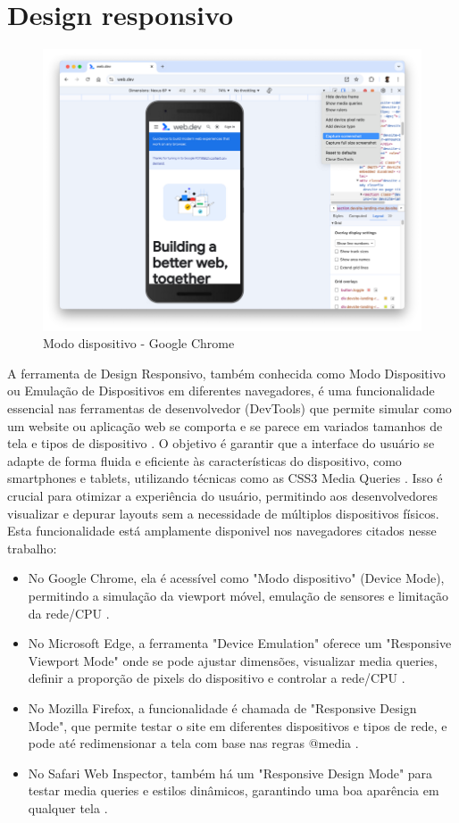 \section{Design responsivo}
\begin{figure}[h!]
    \centering
    \includegraphics[width=0.7\linewidth]{assets/tools/chrome-device.png}
    \caption{Modo dispositivo - Google Chrome }
    \label{fig:enter-label}
\end{figure}
A ferramenta de Design Responsivo, também conhecida como Modo Dispositivo ou Emulação de Dispositivos em diferentes navegadores, é uma funcionalidade essencial nas ferramentas de desenvolvedor (DevTools) que permite simular como um website ou aplicação web se comporta e se parece em variados tamanhos de tela e tipos de dispositivo \cite{edge}. O objetivo é garantir que a interface do usuário se adapte de forma fluida e eficiente às características do dispositivo, como smartphones e tablets, utilizando técnicas como as CSS3 Media Queries \cite{firefox}. Isso é crucial para otimizar a experiência do usuário, permitindo aos desenvolvedores visualizar e depurar layouts sem a necessidade de múltiplos dispositivos físicos. Esta funcionalidade está amplamente disponivel nos navegadores citados nesse trabalho:
\begin{itemize}
    \item No Google Chrome, ela é acessível como "Modo dispositivo" (Device Mode), permitindo a simulação da viewport móvel, emulação de sensores e limitação da rede/CPU \cite{chrome}.
    \item No Microsoft Edge, a ferramenta "Device Emulation" oferece um "Responsive Viewport Mode" onde se pode ajustar dimensões, visualizar media queries, definir a proporção de pixels do dispositivo e controlar a rede/CPU \cite{edge}.
    \item No Mozilla Firefox, a funcionalidade é chamada de "Responsive Design Mode", que permite testar o site em diferentes dispositivos e tipos de rede, e pode até redimensionar a tela com base nas regras @media \cite{firefox}.
    \item No Safari Web Inspector, também há um "Responsive Design Mode" para testar media queries e estilos dinâmicos, garantindo uma boa aparência em qualquer tela \cite{apple}.
\end{itemize}

